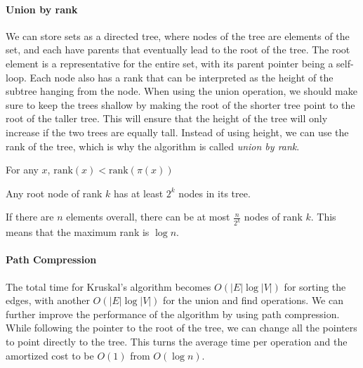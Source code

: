 \paragraph{Union by rank}
We can store sets as a directed tree, where nodes of the tree are elements of the set, and each have parents that eventually lead to the root of the tree.
The root element is a representative for the entire set, with its parent pointer being a self-loop.
Each node also has a rank that can be interpreted as the height of the subtree hanging from the node.
When using the union operation, we should make sure to keep the trees shallow by making the root of the shorter tree point to the root of the taller tree.
This will ensure that the height of the tree will only increase if the two trees are equally tall.
Instead of using height, we can use the rank of the tree, which is why the algorithm is called \textit{union by rank}.

\begin{property}
  For any $x$, $\text{rank}(x) < \text{rank}(\pi (x))$
\end{property}

\begin{property}
  Any root node of rank $k$ has at least $2^k$ nodes in its tree.
\end{property}

\begin{property}
  If there are $n$ elements overall, there can be at most $\frac{n}{2^k}$ nodes of rank $k$.
  This means that the maximum rank is $\log n$.
\end{property}

\paragraph{Path Compression}
The total time for Kruskal's algorithm becomes $O(|E| \log |V|)$ for sorting the edges, with another $O(|E| \log |V|)$ for the union and find operations.
We can further improve the performance of the algorithm by using path compression.
While following the pointer to the root of the tree, we can change all the pointers to point directly to the tree.
This turns the average time per operation and the amortized cost to be $O(1)$ from $O(\log n)$.


